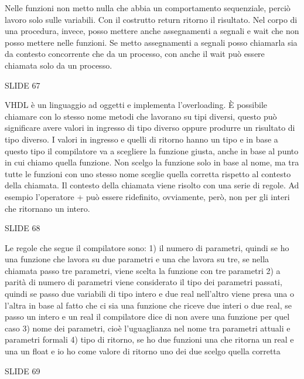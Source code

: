 \documentclass[10pt,a4paper,titlepage]{article}
\begin{document}
Nelle funzioni non metto nulla che abbia un comportamento sequenziale, perciò lavoro solo sulle variabili. Con il costrutto return ritorno il risultato.
Nel corpo di una procedura, invece, posso mettere anche assegnamenti a segnali e wait che non posso mettere nelle funzioni. Se metto assegnamenti a segnali posso chiamarla sia da contesto concorrente che da un processo, con anche il wait può essere chiamata solo da un processo.

SLIDE 67 

VHDL è un linguaggio ad oggetti e implementa l’overloading. È possibile chiamare con lo stesso nome metodi che lavorano su tipi diversi, questo può significare avere valori in ingresso di tipo diverso oppure produrre un risultato di tipo diverso. I valori in ingresso e quelli di ritorno hanno un tipo e in base a questo tipo il compilatore va a scegliere la funzione giusta, anche in base al punto in cui chiamo quella funzione. Non scelgo la funzione solo in base al nome, ma tra tutte le funzioni con uno stesso nome sceglie quella corretta rispetto al contesto della chiamata. Il contesto della chiamata viene risolto con una serie di regole. Ad esempio l’operatore + può essere ridefinito, ovviamente, però, non per gli interi che ritornano un intero.

SLIDE 68

Le regole che segue il compilatore sono: 
1) il numero di parametri, quindi se ho una funzione che lavora su due parametri e una che lavora su tre, se nella chiamata passo tre parametri, viene scelta la funzione con tre parametri
2) a parità di numero di parametri viene considerato il tipo dei parametri passati, quindi se passo due variabili di tipo intero e due real nell’altro viene presa una o l’altra in base al fatto che ci sia una funzione che riceve due interi o due real, se passo un intero e un real il compilatore dice di non avere una funzione per quel caso
3) nome dei parametri, cioè l’uguaglianza nel nome tra parametri attuali e parametri formali
4) tipo di ritorno, se ho due funzioni una che ritorna un real e una un float e io ho come valore di ritorno uno dei due scelgo quella corretta

SLIDE 69
\end{document}
